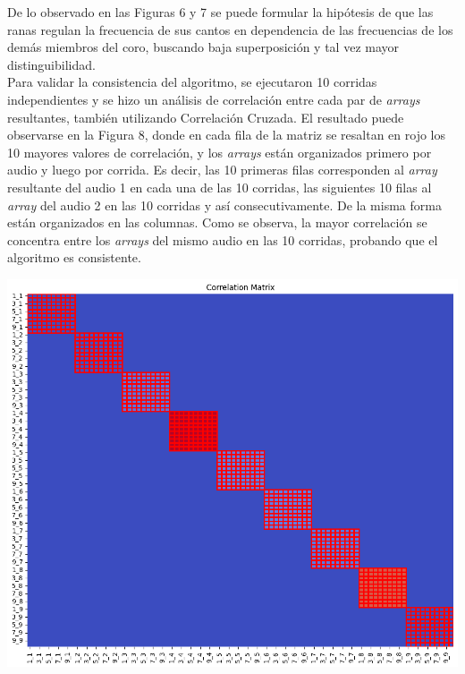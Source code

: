 \documentclass[a0,portrait]{a0poster}
\begin{document}
\begin{multicols}{3}
De lo observado en las Figuras 6 y 7 se puede formular la hipótesis de que las ranas regulan la frecuencia de sus cantos en dependencia de las frecuencias de los demás miembros del coro, buscando baja superposición y tal vez mayor distinguibilidad.\\

Para validar la consistencia del algoritmo, se ejecutaron 10 \space corridas independientes y se hizo un análisis de correlación entre cada par de \textit{arrays} resultantes, también utilizando Correlación Cruzada. 
El resultado puede observarse en la Figura 8, donde en cada fila de la matriz se resaltan en rojo los 10 mayores valores de correlación, y los \textit{arrays} están organizados primero por audio y luego por corrida. 
Es decir, las 10 primeras filas corresponden al \textit{array} resultante del audio 1 en cada una de las 10 corridas, las siguientes 10 filas al \textit{array} del audio 2 en las 10 corridas y así consecutivamente.
De la misma forma están organizados en las columnas.
Como se observa, la mayor correlación se concentra entre los \textit{arrays} del mismo audio en las 10 corridas, probando que el algoritmo es consistente.  


\begin{center}\vspace{0.1cm}
    \includegraphics[width=0.7\linewidth]{assets/correlation_matrix.png}
\end{center}\vspace{0.1cm}



\end{multicols}
\end{document}
